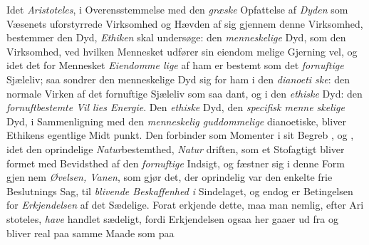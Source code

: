 Idet \emph{Aristoteles}, i Overensstemmelse med den \emph{græske}
Opfattelse af \emph{Dyden} som Væsenets uforstyrrede Virksomhed og
Hævden af sig gjennem denne Virksomhed, bestemmer den
Dyd, \emph{Ethiken} skal undersøge: den \emph{menneskelige} Dyd, som
den Virksomhed, ved hvilken Mennesket udfører sin eiendom\-%
melige Gjerning vel, og idet det for Mennesket \emph{Eiendomme\-%
lige} af ham er bestemt som det \emph{fornuftige} Sjæleliv; saa
sondrer den menneskelige Dyd sig for ham i den \emph{dianoeti\-%
ske}: den normale Virken af det fornuftige Sjæleliv som saa\-%
dant, og i den \emph{ethiske} Dyd: den \emph{fornuftbestemte Vil\-%
lies Energie}. Den \emph{ethiske} Dyd, den \emph{specifisk menne\-%
skelige} Dyd, i Sammenligning med den \emph{menneskelig\-%
guddommelige} dianoetiske, bliver Ethikens egentlige Midt\-%
punkt. Den forbinder som Momenter i sit Begreb ,
 og , idet den oprindelige \emph{Natur}bestemthed, \emph{Natur}\-%
driften, som et Stofagtigt bliver formet med Bevidsthed af
den \emph{fornuftige} Indsigt, og fæstner sig i denne Form gjen\-%
nem \emph{Øvelsen, Vanen}, som gjør det, der oprindelig var den
enkelte frie Beslutnings Sag, til \emph{blivende Beskaffenhed i}
Sindelaget, og endog er Betingelsen for \emph{Erkjendelsen} af det
Sædelige. Forat erkjende dette, maa man nemlig, efter Ari\-%
stoteles, \emph{have} handlet sædeligt, fordi Erkjendelsen ogsaa her
gaaer ud fra  og bliver real paa samme Maade som paa
